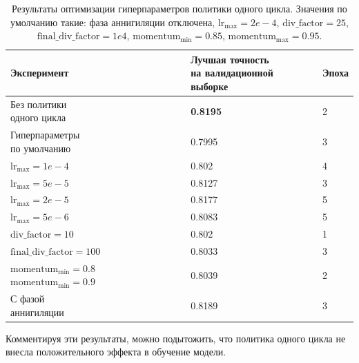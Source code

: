 \documentclass[conference]{IEEEtran}
\begin{document}
\begin{table}[h!]
    \begin{center}
        \begin{tabular}{|l|l|l|}
            \hline
            Эксперимент & \thead{Лучшая точность \\ на валидационной выборке} & Эпоха \\ \hline
            \makecell[l]{Без политики \\ одного цикла} & \textbf{0.8195} & 2 \\ \hline
            \makecell[l]{Гиперпараметры \\ по умолчанию} & 0.7995 & 3 \\ \hline
            $\text{lr}_\text{max} = 1e-4$ & 0.802 & 4 \\ \hline
            $\text{lr}_\text{max} = 5e-5$ & 0.8127 & 3 \\ \hline
            $\text{lr}_\text{max} = 2e-5$ & 0.8177 & 5 \\ \hline
            $\text{lr}_\text{max} = 5e-6$ & 0.8083 & 5 \\ \hline
            $\text{div\_factor} = 10$ & 0.802 & 1 \\ \hline
            $\text{final\_div\_factor} = 100$ & 0.8033 & 3 \\ \hline
            \makecell[l]{$\text{momentum}_\text{min} = 0.8$ \\ $\text{momentum}_\text{min} = 0.9$} & 0.8039 & 2 \\ \hline
            \makecell[l]{С фазой \\ аннигиляции} & 0.8189 & 3 \\ \hline
        \end{tabular}
        \caption{Результаты оптимизации гиперпараметров политики одного цикла. Значения по умолчанию такие: фаза аннигиляции отключена, $\text{lr}_\text{max} = 2e-4$, $\text{div\_factor} = 25$, $\text{final\_div\_factor} = 1e4$, $\text{momentum}_\text{min} = 0.85$, $\text{momentum}_\text{max} = 0.95$.}
        \label{tab:one-cycle-policy-optimization-results}    
    \end{center}
\end{table}

Комментируя эти результаты, можно подытожить, что политика одного цикла не внесла положительного эффекта в обучение модели.
\end{document}
